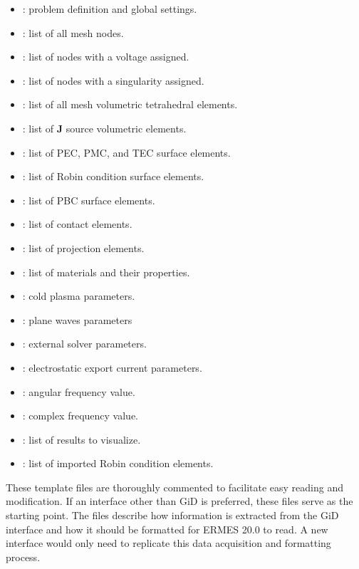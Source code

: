 \begin{itemize}\itemsep0em 
	\item {}: problem definition and global settings.
	\item {}: list of all mesh nodes.
	\item {}: list of nodes with a voltage assigned.
	\item {}: list of nodes with a singularity assigned.
	\item {}: list of all mesh volumetric tetrahedral elements.
	\item {}: list of \textbf{J} source volumetric elements.
	\item {}: list of PEC, PMC, and TEC surface elements.
	\item {}: list of Robin condition surface elements.
	\item {}: list of PBC surface elements.
	\item {}: list of contact elements.
	\item {}: list of projection elements.
	\item {}: list of materials and their properties.
	\item {}: cold plasma parameters.
	\item {}: plane waves parameters
	\item {}: external solver parameters.
	\item {}: electrostatic export current parameters.
	\item {}: angular frequency value.
	\item {}: complex frequency value.
	\item {}: list of results to visualize.
	\item {}: list of imported Robin condition elements.
\end{itemize}
These  template files are thoroughly commented to facilitate easy reading and modification. If an interface other than GiD is preferred, these files serve as the starting point. The  files describe how information is extracted from the GiD interface and how it should be formatted for ERMES 20.0 to read. A new interface would only need to replicate this data acquisition and formatting process.

